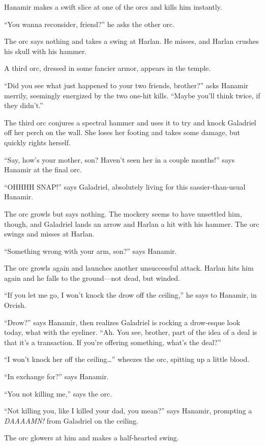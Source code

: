 \documentclass[smalldemyvopaper,11pt,twoside,onecolumn,openright,extrafontsizes]{memoir}
\begin{document}
Hanamir makes a swift slice at one of the orcs and kills him instantly.

``You wanna reconsider, friend?'' he asks the other orc.

The orc says nothing and takes a swing at Harlan. He misses, and Harlan
crushes his skull with his hammer.

A third orc, dressed in some fancier armor, appears in the temple.

``Did you see what just happened to your two friends, brother?'' asks
Hanamir merrily, seemingly energized by the two one-hit kills. ``Maybe
you'll think twice, if they didn't.''

The third orc conjures a spectral hammer and uses it to try and knock
Galadriel off her perch on the wall. She loses her footing and takes
some damage, but quickly rights herself.

``Say, how's your mother, son? Haven't seen her in a couple months!''
says Hanamir at the final orc.

``OHHHH SNAP!'' says Galadriel, absolutely living for this
sassier-than-usual Hanamir.

The orc growls but says nothing. The mockery seems to have unsettled
him, though, and Galadriel lands an arrow and Harlan a hit with his
hammer. The orc swings and misses at Harlan.

``Something wrong with your arm, son?'' says Hanamir.

The orc growls again and launches another unsuccessful attack. Harlan
hits him again and he falls to the ground---not dead, but winded.

``If you let me go, I won't knock the drow off the ceiling,'' he says to
Hanamir, in Orcish.

``Drow?'' says Hanamir, then realizes Galadriel is rocking a drow-esque
look today, what with the eyeliner. ``Ah. You see, brother, part of the
idea of a deal is that it's a transaction. If you're offering something,
what's the deal?''

``I won't knock her off the ceiling\ldots{}'' wheezes the orc, spitting
up a little blood.

``In exchange for?'' says Hanamir.

``You not killing me,'' says the orc.

``Not killing you, like I killed your dad, you mean?'' says Hanamir,
prompting a \emph{DAAAAMN!} from Galadriel on the ceiling.

The orc glowers at him and makes a half-hearted swing.
\end{document}
